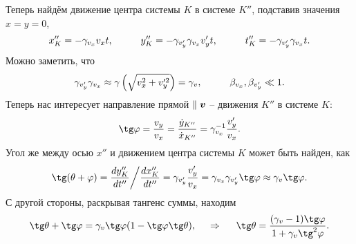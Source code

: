 Теперь найдём движение центра системы $K$ в системе $K''$, подставив значения $x=y=0$,
\begin{equation*}
    x''_K = - \gamma_{v_x} v_x t,
    \hspace{1 cm}
    y''_K = - \gamma_{v_y'} \gamma_{v_x} v_y' t,
    \hspace{1 cm}
    t''_K = - \gamma_{v_y'} \gamma_{v_x}  t.
\end{equation*}
Можно заметить, что
\begin{equation*}
    \gamma_{v_y'} \gamma_{v_x} \approx \gamma\left(\sqrt{v_x^2 + v_y'^2}\right) = \gamma_v,
    \hspace{1 cm}
    \beta_{v_x}, \beta_{v_y'} \ll 1.
\end{equation*}
Теперь нас интересует направление прямой $\parallel \mbox{\boldmath $v$}$ -- движения $K''$ в системе $K$:
\begin{equation*}
    \tg \varphi = \frac{v_y}{v_x} = \frac{\dot{y}_{K''}}{\dot{x}_{K''}} = \gamma_{v_x}^{-1} \frac{v_y'}{v_x}.
\end{equation*}
Угол же между осью $x''$ и движением центра системы $K$ может быть найден, как
\begin{equation*}
    \tg (\theta + \varphi) = \frac{d y''_K}{d t''} \bigg/ \frac{d x''_K}{d t''} = 
    \gamma_{v_y'}
    \frac{v_y'}{v_x} = \gamma_{v_x} \gamma_{v_y'} \tg \varphi \approx \gamma_v \tg \varphi.
\end{equation*}
С другой стороны, раскрывая тангенс суммы, находим
\begin{equation*}
    \tg \theta + \tg \varphi = \gamma_v \tg \varphi (1 - \tg \varphi \tg \theta),
    \hspace{0.5cm} \Rightarrow \hspace{0.5cm}
    \tg \theta = \frac{(\gamma_v - 1) \tg \varphi}{1 + \gamma_v \tg^2 \varphi}.
\end{equation*}